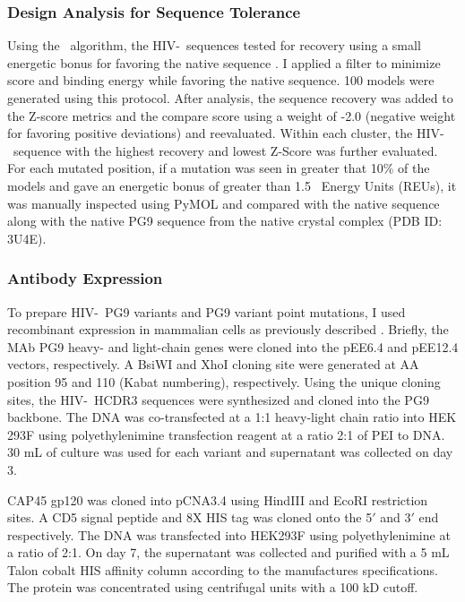 \subsubsection{Design Analysis for Sequence Tolerance}
Using the \rosettadesign~algorithm, the HIV-\naive~sequences tested for recovery using a small energetic bonus for favoring the native sequence \citep{Kuhlman:2000tc}. I applied a filter to minimize score and binding energy while favoring the native sequence. 100 models were generated using this protocol. After analysis, the sequence recovery was added to the Z-score metrics and the compare score using a weight of -2.0 (negative weight for favoring positive deviations) and reevaluated. Within each cluster, the HIV-\naive~sequence with the highest recovery and lowest Z-Score was further evaluated. For each mutated position, if a mutation was seen in greater that 10\% of the models and gave an energetic bonus of greater than 1.5 \rosetta~Energy Units (REUs), it was manually inspected using PyMOL and compared with the native sequence along with the native PG9 sequence from the native crystal complex (PDB ID: 3U4E).

\subsubsection{Antibody Expression}
To prepare HIV-\naive~PG9 variants and PG9 variant point mutations, I used recombinant expression in mammalian cells as previously described \citep{Xu:2010da}. Briefly, the MAb PG9 heavy- and light-chain genes were cloned into the pEE6.4 and pEE12.4 vectors, respectively. A BsiWI and XhoI cloning site were generated at AA position 95 and 110 (Kabat numbering), respectively. Using the unique cloning sites, the HIV-\naive~HCDR3 sequences were synthesized and cloned into the PG9 backbone. The DNA was co-transfected at a 1:1 heavy-light chain ratio into HEK 293F using polyethylenimine transfection reagent at a ratio 2:1 of PEI to DNA. 30 mL of culture was used for each variant and supernatant was collected on day 3.

CAP45 gp120 was cloned into pCNA3.4 using HindIII and EcoRI restriction sites. A CD5 signal peptide and 8X HIS tag was cloned onto the 5$'$ and 3$'$ end respectively. The DNA was transfected into HEK293F using polyethylenimine at a ratio of 2:1. On day 7, the supernatant was collected and purified with a 5 mL Talon cobalt HIS affinity column according to the manufactures specifications. The protein was concentrated using centrifugal units with a 100 kD cutoff.

